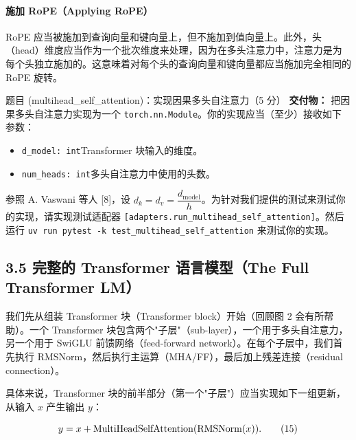 \paragraph*{施加 RoPE（Applying RoPE）}
RoPE 应当被施加到查询向量和键向量上，但不施加到值向量上。此外，头（head）维度应当作为一个批次维度来处理，因为在多头注意力中，注意力是为每个头独立施加的。这意味着对每个头的查询向量和键向量都应当施加完全相同的 RoPE 旋转。

\begin{problembox}{题目 (multihead\_self\_attention)：实现因果多头自注意力（5 分）}
\textbf{交付物：} 把因果多头自注意力实现为一个 \texttt{torch.nn.Module}。你的实现应当（至少）接收如下参数：

\begin{itemize}[leftmargin=2.4em]
  \item \texttt{d\_model: int}\quad Transformer 块输入的维度。
  \item \texttt{num\_heads: int}\quad 多头自注意力中使用的头数。
\end{itemize}

参照 A. Vaswani 等人 [8]，设 $d_k = d_v = \dfrac{d_{\text{model}}}{h}$。为针对我们提供的测试来测试你的实现，请实现测试适配器 \texttt{[adapters.run\_multihead\_self\_attention]}。然后运行 \texttt{uv run pytest -k test\_multihead\_self\_attention} 来测试你的实现。
\end{problembox}

\subsection*{3.5 完整的 Transformer 语言模型（The Full Transformer LM）}

我们先从组装 Transformer 块（Transformer block）开始（回顾图 2 会有所帮助）。一个 Transformer 块包含两个"子层"（sub-layer），一个用于多头自注意力，另一个用于 SwiGLU 前馈网络（feed-forward network）。在每个子层中，我们首先执行 RMSNorm，然后执行主运算（MHA/FF），最后加上残差连接（residual connection）。

具体来说，Transformer 块的前半部分（第一个"子层"）应当实现如下一组更新，从输入 $x$ 产生输出 $y$：

\begin{equation*}
y = x + \mathrm{MultiHeadSelfAttention}(\operatorname{RMSNorm}(x)).
\tag{15}
\end{equation*}

